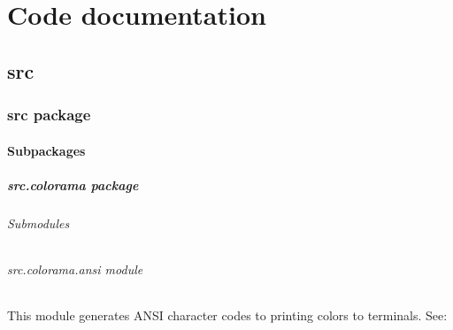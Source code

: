\documentclass[a4paper,10pt,english]{sphinxmanual}
\begin{document}
\chapter{Code documentation}
\label{\detokenize{index:code-documentation}}

\section{src}
\label{\detokenize{commands/apidoc/modules:src}}\label{\detokenize{commands/apidoc/modules::doc}}

\subsection{src package}
\label{\detokenize{commands/apidoc/src::doc}}\label{\detokenize{commands/apidoc/src:src-package}}

\subsubsection{Subpackages}
\label{\detokenize{commands/apidoc/src:subpackages}}

\paragraph{src.colorama package}
\label{\detokenize{commands/apidoc/src.colorama:src-colorama-package}}\label{\detokenize{commands/apidoc/src.colorama::doc}}

\subparagraph{Submodules}
\label{\detokenize{commands/apidoc/src.colorama:submodules}}

\subparagraph{src.colorama.ansi module}
\label{\detokenize{commands/apidoc/src.colorama:module-src.colorama.ansi}}\label{\detokenize{commands/apidoc/src.colorama:src-colorama-ansi-module}}
This module generates ANSI character codes to printing colors to terminals.
See: 
\end{document}
